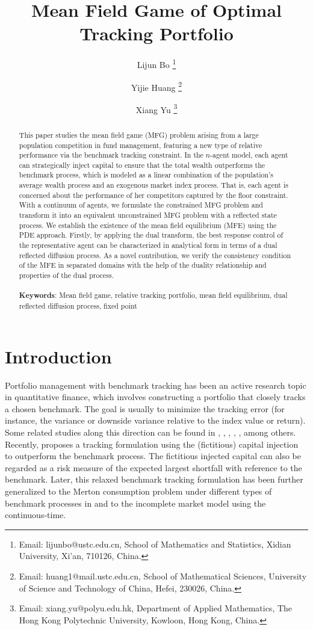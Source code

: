 \documentclass[11pt,times,letter]{article}
\title{ Mean Field Game of Optimal Tracking Portfolio}
\author{Lijun Bo \thanks{Email: lijunbo@ustc.edu.cn, School of Mathematics and Statistics, Xidian University, Xi'an, 710126, China.}
\and
Yijie Huang \thanks{Email: huang1@mail.ustc.edu.cn, School of Mathematical Sciences, University of Science and Technology of China, Hefei, 230026, China.}
\and
Xiang Yu \thanks{Email: xiang.yu@polyu.edu.hk, Department of Applied Mathematics, The Hong Kong Polytechnic University, Kowloon, Hong Kong, China.}
}
\date{\vspace{-0.5in}}
\numberwithin{equation}{section}
\begin{document}
\maketitle

\begin{abstract}
This paper studies the mean field game (MFG) problem arising from a large population competition in fund management, featuring a new type of relative performance via the benchmark tracking constraint. In the $n$-agent model, each agent can strategically inject capital to ensure that the total wealth outperforms the benchmark process, which is modeled as a linear combination of the population's average wealth process and an exogenous  market index process. That is, each agent is concerned about the performance of her competitors captured by the floor constraint. With a continuum of agents, we formulate the constrained MFG problem and transform it into an equivalent unconstrained MFG problem with a reflected state process. We establish the existence of the mean field equilibrium (MFE) using the PDE approach. Firstly, by applying the dual transform, the best response control of the representative agent can be characterized in analytical form in terms of a dual reflected diffusion process. As a novel contribution, we verify the consistency condition of the MFE in separated domains with the help of the duality relationship and properties of the dual process.\\
\ \\
\textbf{Keywords}: Mean field game, relative tracking portfolio, mean field equilibrium, dual reflected diffusion process, fixed point     
\end{abstract}

\vspace{0.1in}
\section{Introduction}
Portfolio  management with benchmark tracking has been an active research topic in quantitative finance, which involves constructing a portfolio that closely tracks a chosen benchmark.  The goal is usually to minimize the tracking error (for instance, the variance or downside variance relative to the index value or return). Some related studies along this direction can be found in \cite{Browne9,Browne99,Browne00}, \cite{Gaivoronski05},  \cite{YaoZZ06}, \cite{Strub18}, \cite{NLFC}, among others.  Recently,  \cite{BoLiaoYu21} proposes a tracking formulation using the (fictitious) capital injection to outperform the benchmark process. The fictitious injected capital can also be regarded as a risk measure of the expected largest shortfall with reference to the benchmark. Later, this relaxed benchmark tracking formulation has been further generalized to the Merton consumption problem under different types of benchmark processes in \cite{BHY23,BHY24a,BHY24b} and to the incomplete market model using the continuous-time.
\end{document}
